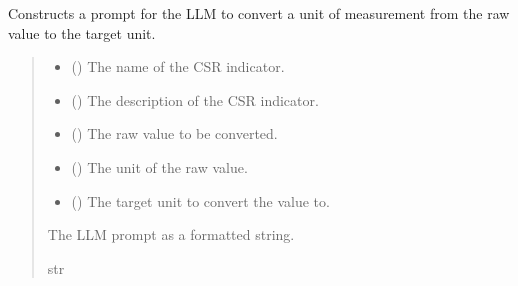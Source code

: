 \documentclass[letterpaper,10pt,english]{sphinxmanual}
\begin{document}
\begin{fulllineitems}
\label{\detokenize{modules.data_storage:modules.data_storage.llm_standardize.build_conversion_prompt}}
\pysigstartsignatures
\pysiglinewithargsret
{}
{\sphinxparamcomma {}\sphinxparamcomma {}\sphinxparamcomma {}\sphinxparamcomma {}}
{}
\pysigstopsignatures
\sphinxAtStartPar
Constructs a prompt for the LLM to convert a unit of measurement from the raw value to the target unit.
\begin{quote}\begin{description}
\begin{itemize}
\item {} 
\sphinxAtStartPar
{} () \textendash{} The name of the CSR indicator.

\item {} 
\sphinxAtStartPar
{} () \textendash{} The description of the CSR indicator.

\item {} 
\sphinxAtStartPar
{} () \textendash{} The raw value to be converted.

\item {} 
\sphinxAtStartPar
{} () \textendash{} The unit of the raw value.

\item {} 
\sphinxAtStartPar
{} () \textendash{} The target unit to convert the value to.

\end{itemize}

\sphinxAtStartPar
The LLM prompt as a formatted string.

\sphinxAtStartPar
str

\end{description}\end{quote}

\end{fulllineitems}
\end{document}

